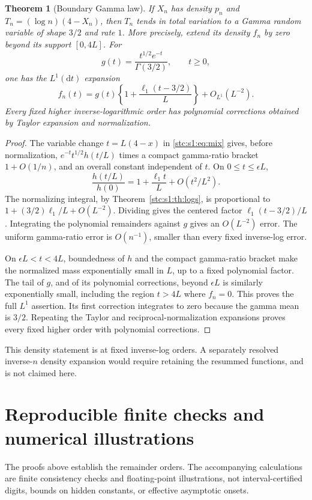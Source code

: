 \documentclass[11pt,letterpaper]{article}
\numberwithin{equation}{section}
\newtheorem{theorem}{Theorem}[section]
\theoremstyle{remark}\newtheorem{remark}[theorem]{Remark}
\newcommand{\Ga}{\Gamma}
\begin{document}
\begin{theorem}[Boundary Gamma law]\label{stc:s1:th:boundary}
If $X_n$ has density $p_n$ and $T_n=(\log n)(4-X_n)$, then $T_n$ tends in total variation to a Gamma random variable of shape $3/2$ and rate $1$. More precisely, extend its density $f_n$ by zero beyond its support $[0,4L]$. For
\[
 g(t)=\frac{t^{1/2}e^{-t}}{\Ga(3/2)},\qquad t\geq0,
\]
one has the $L^1(\mathrm dt)$ expansion
\begin{equation}\label{stc:s1:eq:boundary}
 f_n(t)=g(t)\left\{1+\frac{\ell_1(t-3/2)}L\right\}
                   +O_{L^1}(L^{-2}).
\end{equation}
Every fixed higher inverse-logarithmic order has polynomial corrections obtained by Taylor expansion and normalization.
\end{theorem}
\begin{proof}
The variable change $t=L(4-x)$ in \eqref{stc:s1:eq:mix} gives, before normalization, $e^{-t}t^{1/2}h(t/L)$ times a compact gamma-ratio bracket $1+O(1/n)$, and an overall constant independent of $t$. On $0\leq t\leq\epsilon L$,
\[
 \frac{h(t/L)}{h(0)}=1+\frac{\ell_1t}L+O(t^2/L^2).
\]
The normalizing integral, by Theorem~\ref{stc:s1:th:logs}, is proportional to $1+(3/2)\ell_1/L+O(L^{-2})$. Dividing gives the centered factor $\ell_1(t-3/2)/L$. Integrating the polynomial remainders against $g$ gives an $O(L^{-2})$ error. The uniform gamma-ratio error is $O(n^{-1})$, smaller than every fixed inverse-log error.

On $\epsilon L<t<4L$, boundedness of $h$ and the compact gamma-ratio bracket make the normalized mass exponentially small in $L$, up to a fixed polynomial factor. The tail of $g$, and of its polynomial corrections, beyond $\epsilon L$ is similarly exponentially small, including the region $t>4L$ where $f_n=0$. This proves the full $L^1$ assertion. Its first correction integrates to zero because the gamma mean is $3/2$. Repeating the Taylor and reciprocal-normalization expansions proves every fixed higher order with polynomial corrections.
\end{proof}
This density statement is at fixed inverse-log orders. A separately resolved inverse-$n$ density expansion would require retaining the resummed functions, and is not claimed here.

\section{Reproducible finite checks and numerical illustrations}\label{stc:s1:sec:checks}
The proofs above establish the remainder orders. The accompanying calculations are finite consistency checks and floating-point illustrations, not interval-certified digits, bounds on hidden constants, or effective asymptotic onsets.
\end{document}

